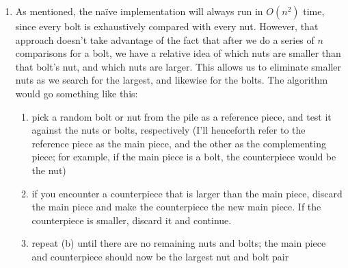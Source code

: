 \documentclass[12pt]{article}
\begin{document}
\begin{enumerate}
    \item As mentioned, the naïve implementation will always run in $O(n^2)$ time, since every bolt is exhaustively 
    compared with every nut. However, that approach doesn't take advantage of the fact that after we do a series of $n$ 
    comparisons for a bolt, we have a relative idea of which nuts are smaller than that bolt's nut, and which nuts are 
    larger. This allows us to eliminate smaller nuts as we search for the largest, and likewise for the bolts. The algorithm 
    would go something like this:

    \begin{enumerate}
        \item pick a random bolt or nut from the pile as a reference piece, and test it against the nuts or bolts, respectively 
        (I'll henceforth refer to the reference piece as the main piece, and the other as the complementing piece; for example, if the main piece is 
        a bolt, the counterpiece would be the nut)
        \item if you encounter a counterpiece that is larger than the main piece, discard the main piece and make the counterpiece 
        the new main piece. If the counterpiece is smaller, discard it and continue.
        \item repeat (b) until there are no remaining nuts and bolts; the main piece and counterpiece should now be the 
        largest nut and bolt pair
    \end{enumerate}
\end{enumerate}
\end{document}

